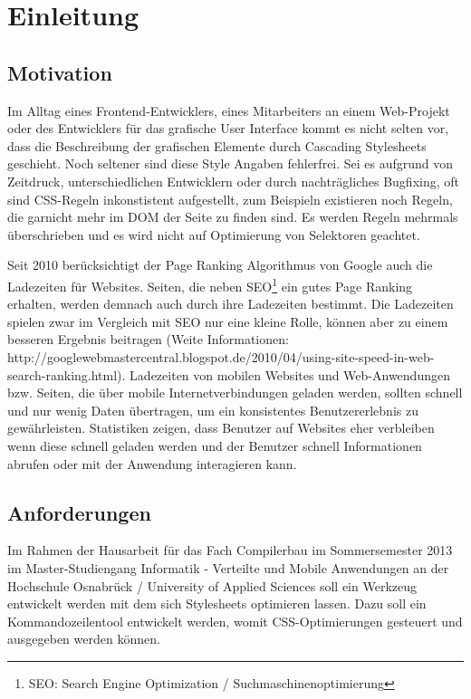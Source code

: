 \section{Einleitung}
\subsection{Motivation}
Im Alltag eines Frontend-Entwicklers, eines Mitarbeiters an einem Web-Projekt oder des Entwicklers für das grafische User Interface kommt es nicht selten vor, dass die Beschreibung der grafischen Elemente durch Cascading Stylesheets geschieht. Noch seltener sind diese Style Angaben fehlerfrei. Sei es aufgrund von Zeitdruck, unterschiedlichen Entwicklern oder durch nachträgliches Bugfixing, oft sind CSS-Regeln inkonstistent aufgestellt, zum Beispieln existieren noch Regeln, die garnicht mehr im DOM der Seite zu finden sind. Es werden Regeln mehrmals überschrieben und es wird nicht auf Optimierung von Selektoren geachtet. 

Seit 2010 berücksichtigt der Page Ranking Algorithmus von Google auch die Ladezeiten für Websites. Seiten, die neben SEO\footnote{SEO: Search Engine Optimization / Suchmaschinenoptimierung} ein gutes Page Ranking erhalten, werden demnach auch durch ihre Ladezeiten bestimmt. Die Ladezeiten spielen zwar im Vergleich mit SEO nur eine kleine Rolle, können aber zu einem besseren Ergebnis beitragen (Weite Informationen: http://googlewebmastercentral.blogspot.de/2010/04/using-site-speed-in-web-search-ranking.html).
Ladezeiten von mobilen Websites und Web-Anwendungen bzw. Seiten, die über mobile Internetverbindungen geladen werden, sollten schnell und nur wenig Daten übertragen, um ein konsistentes Benutzererlebnis zu gewährleisten. Statistiken zeigen, dass Benutzer auf Websites eher verbleiben wenn diese schnell geladen werden und der Benutzer schnell Informationen abrufen oder mit der Anwendung interagieren kann.

\subsection{Anforderungen}

Im Rahmen der Hausarbeit für das Fach Compilerbau im Sommersemester 2013 im Master-Studiengang Informatik - Verteilte und Mobile Anwendungen an der Hochschule Osnabrück / University of Applied Sciences soll ein Werkzeug entwickelt werden mit dem sich Stylesheets optimieren lassen. Dazu soll ein Kommandozeilentool entwickelt werden, womit CSS-Optimierungen gesteuert und ausgegeben werden können. 

